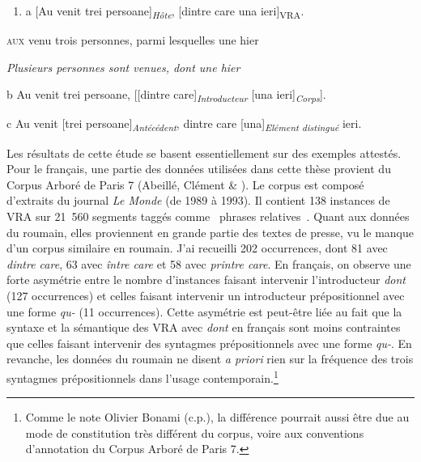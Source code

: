 \begin{enumerate}
\item a  [Au venit trei persoane]\textit{\textsubscript{Hôte}}, [dintre care una ieri]\textsubscript{VRA}. 


\end{enumerate}
  \textsc{aux} venu trois personnes, parmi lesquelles une hier

  \textit{Plusieurs personnes sont venues, dont une hier}

  b  Au venit trei persoane, [[dintre care]\textit{\textsubscript{Introducteur}} [una ieri]\textit{\textsubscript{Corps}}].

  c  Au venit [trei persoane]\textit{\textsubscript{Antécédent}}, dintre care [una]\textit{\textsubscript{Elément distingué}} ieri.

Les résultats de cette étude se basent essentiellement sur des exemples attestés. Pour le français, une partie des données utilisées dans cette thèse provient du Corpus Arboré de Paris 7 (Abeillé, Clément \& \citet{Toussenel2003}). Le corpus est composé d'extraits du journal \textit{Le Monde} (de 1989 à 1993). Il contient 138 instances de VRA sur 21~560 segments taggés comme {\guillemotleft}~phrases relatives~{\guillemotright}. Quant aux données du roumain, elles proviennent en grande partie des textes de presse, vu le manque d'un corpus similaire en roumain. J'ai recueilli 202 occurrences, dont 81 avec \textit{dintre care}, 63 avec \textit{între care} et 58 avec \textit{printre care}. En français, on observe une forte asymétrie entre le nombre d'instances faisant intervenir l'introducteur \textit{dont} (127 occurrences)  et celles faisant intervenir un introducteur prépositionnel avec une forme \textit{qu-} (11 occurrences). Cette asymétrie est peut-être liée au fait que la syntaxe et la sémantique des VRA avec \textit{dont} en français sont moins contraintes que celles faisant intervenir des syntagmes prépositionnels avec une forme \textit{qu-}. En revanche, les données du roumain ne disent \textit{a priori} rien sur la fréquence des trois syntagmes prépositionnels dans l'usage contemporain.\footnote{Comme le note Olivier Bonami (c.p.), la différence pourrait aussi être due au mode de constitution très différent du corpus, voire aux conventions d'annotation du Corpus Arboré de Paris 7.}

